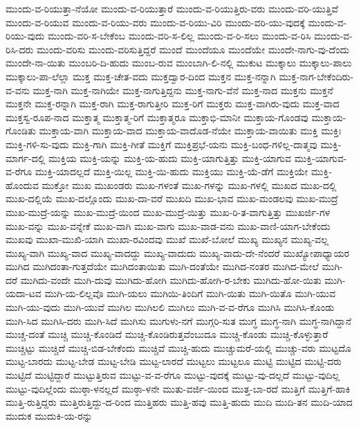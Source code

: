 {ಮುಂದು-ವ-ರಿಯುತ್ತಾ-ನೆಯೋ
ಮುಂದು-ವ-ರಿಯುತ್ತಾರೆ
ಮುಂದು-ವ-ರಿಯುತ್ತಿರು-ವರು
ಮುಂದು-ವರಿ-ಯುತ್ತಿವೆ
ಮುಂದು-ವ-ರಿಯುವ
ಮುಂದು-ವ-ರಿಯು-ವರು
ಮುಂದು-ವ-ರಿಯು-ವಿರಿ
ಮುಂದು-ವರಿ-ಯು-ವುದಕ್ಕೆ
ಮುಂದು-ವ-ರಿಯು-ವುದು
ಮುಂದು-ವರಿ-ಸ-ಬೇಕೆಂಬ
ಮುಂದು-ವರಿ-ಸ-ಲಿಲ್ಲ
ಮುಂದು-ವ-ರಿ-ಸಲು
ಮುಂದು-ವ-ರಿಸಿ
ಮುಂದು-ವ-ರಿಸಿ-ದರು
ಮುಂದು-ವರಿಸು
ಮುಂದು-ವರಿಸುತ್ತಿದ್ದರೆ
ಮುಂದೆ
ಮುಂದೆಯೂ
ಮುಂದೆಯೇ
ಮುಂದೇ-ನಾಗು-ವು-ದೆಂದು
ಮುಂದೇ-ನಾ-ಯಿತು
ಮುಂಬರಿ-ದಿ-ಹುದು
ಮುಂಬ-ರುವ
ಮುಂಬಾಗಿ-ಲಿ-ನಲ್ಲಿ
ಮುಕುಟ
ಮುಕ್ಕಾಲು
ಮುಕ್ಕಾಲು-ಪಾಲು
ಮುಕ್ಕಾಲು-ಪಾ-ಲೆಲ್ಲಾ
ಮುಕ್ತ
ಮುಕ್ತ-ಚೇತ-ವದು
ಮುಕ್ತದ್ವಾರ-ದಿಂದ
ಮುಕ್ತನ
ಮುಕ್ತ-ನನ್ನಾಗಿ
ಮುಕ್ತ-ನಾಗ-ಬೇಕೆಂದಿರು-ವ-ವನು
ಮುಕ್ತ-ನಾಗಿ
ಮುಕ್ತ-ನಾಗಿಯೇ
ಮುಕ್ತ-ನಾಗುತ್ತಿದ್ದನು
ಮುಕ್ತ-ನಾಗು-ವೆನೆ
ಮುಕ್ತ-ನಾದ
ಮುಕ್ತನು
ಮುಕ್ತನೆ
ಮುಕ್ತನೇ
ಮುಕ್ತ-ರನ್ನಾಗಿ
ಮುಕ್ತ-ರಾಗಿ
ಮುಕ್ತ-ರಾಗುತ್ತೀರಿ
ಮುಕ್ತ-ರಿಗೆ
ಮುಕ್ತರು
ಮುಕ್ತ-ವಾಗಿರು-ವುದು
ಮುಕ್ತ-ವಾದ
ಮುಕ್ತಸ್ವ-ರೂಪ-ನಾದ
ಮುಕ್ತಾತ್ಮ
ಮುಕ್ತಾತ್ಮ-ರಿಗೆ
ಮುಕ್ತಾತ್ಮರೂ
ಮುಕ್ತಾಭಿ-ಮಾನೀ
ಮುಕ್ತಾಯ-ಗೊಂಡವು
ಮುಕ್ತಾಯ-ಗೊಂಡಿತು
ಮುಕ್ತಾಯ-ವಾಗಿ
ಮುಕ್ತಾಯ-ವಾದ
ಮುಕ್ತಾಯ-ವಾದೊಡ-ನೆಯೇ
ಮುಕ್ತಾಯ-ವಾಯಿತು
ಮುಕ್ತಿ
ಮುಕ್ತಿಃ
ಮುಕ್ತಿ-ಗಳಿ-ಸು-ವುದು
ಮುಕ್ತಿ-ಗಾಗಿ
ಮುಕ್ತಿ-ಗೀತೆ
ಮುಕ್ತಿಗೆ
ಮುಕ್ತಿಪ್ರಭೆ-ಯನು
ಮುಕ್ತಿ-ಬಂಧ-ಗಳಿಲ್ಲ-ದಾತ್ಮವು
ಮುಕ್ತಿ-ಮಾರ್ಗ-ದಲ್ಲಿ
ಮುಕ್ತಿಯ
ಮುಕ್ತಿ-ಯನ್ನು
ಮುಕ್ತಿ-ಯ-ಹುದು
ಮುಕ್ತಿ-ಯಾಗುತ್ತಿತ್ತು
ಮುಕ್ತಿ-ಯಾಗುವ
ಮುಕ್ತಿ-ಯಾಗುವ-ವ-ರೆಗೂ
ಮುಕ್ತಿ-ಯಾದಲ್ಲದೆ
ಮುಕ್ತಿ-ಯಿಲ್ಲ
ಮುಕ್ತಿ-ಯಿ-ಹುದು
ಮುಕ್ತಿಯು
ಮುಕ್ತಿ-ಯೆ-ಡೆಗೆ
ಮುಕ್ತಿಯೇ
ಮುಕ್ತಿ-ಹೊಂದುವ
ಮುಕ್ತೋ
ಮುಖ
ಮುಖಂಡರು
ಮುಖ-ಗಳಂತೆ
ಮುಖ-ಗಳನ್ನು
ಮುಖ-ಗಳಲ್ಲಿ
ಮುಖದ
ಮುಖ-ದಲ್ಲಿ
ಮುಖ-ದಲ್ಲಿಯೆ
ಮುಖ-ದಲ್ಲೊಂದು
ಮುಖ-ದಾ-ವರೆ
ಮುಖದಿ
ಮುಖ-ಭಾವ
ಮುಖ-ಮಂಡಲವು
ಮುಖ-ಮುದ್ರೆ
ಮುಖ-ಮುದ್ರೆ-ಯನ್ನು
ಮುಖ-ಮುದ್ರೆ-ಯಿಂದ
ಮುಖ-ಮುದ್ರೆ-ಯಿತ್ತು
ಮುಖ-ರಿ-ತ-ವಾಗುತ್ತಿತ್ತು
ಮುಖರ್ಜಿ-ಗಳ
ಮುಖ-ವನ್ನು
ಮುಖ-ವನ್ನೇಕೆ
ಮುಖ-ವಾಗಿ
ಮುಖ-ವಾಗು
ಮುಖ-ವಾಡ-ವನು
ಮುಖ-ವಾಣಿ-ಯಾಗ-ಬೇಕೆಂದು
ಮುಖವು
ಮುಖಾ-ಮುಖಿ-ಯಾಗಿ
ಮುಖಾ-ರವಿಂದವು
ಮುಖೆ
ಮುಖೆ-ಬೋಲೆ
ಮುಖ್ಯ
ಮುಖ್ಯನ
ಮುಖ್ಯ-ವಲ್ಲ
ಮುಖ್ಯ-ವಾಗಿ
ಮುಖ್ಯ-ವಾದ
ಮುಖ್ಯ-ವಾದದ್ದು
ಮುಖ್ಯ-ವಾದುದು
ಮುಖ್ಯ-ವಾದು-ದೇ-ನೆಂದರೆ
ಮುಖ್ಯೋಪಾಧ್ಯಾಯರ
ಮುಗಿದ
ಮುಗಿದಂತಾ-ಗುತ್ತದೆಯೇ
ಮುಗಿದಂತಾಯಿತು
ಮುಗಿ-ದಂತೆಯೇ
ಮುಗಿದ-ನಂತರ
ಮುಗಿದ-ಮೇಲೆ
ಮುಗಿ-ದರೆ
ಮುಗಿದು-ವಂದೇ
ಮುಗಿ-ದುವು
ಮುಗಿದು-ಹೋಗಿ
ಮುಗಿದು-ಹೋಗಿ-ರ-ಬೇಕು
ಮುಗಿದು-ಹೋ-ಯಿತು
ಮುಗಿ-ಯದಾ-ಟವ
ಮುಗಿ-ಯ-ಲಿಲ್ಲವೊ
ಮುಗಿ-ಯಲು
ಮುಗಿಯಿ-ತಿಂದಿಗೆ
ಮುಗಿ-ಯಿತು
ಮುಗಿ-ಯಿತೊ
ಮುಗಿ-ಯುವ
ಮುಗಿ-ಯು-ವುದು
ಮುಗಿ-ಯುವೆ
ಮುಗಿಲ
ಮುಗಿಲಲಿ
ಮುಗಿಲು
ಮುಗಿ-ವ-ವ-ರೆಗೂ
ಮುಗಿಸಿ
ಮುಗಿಸಿ-ಕೊಂಡು
ಮುಗಿ-ಸಿದ
ಮುಗಿಸಿ-ದರು
ಮುಗಿ-ಸಿದೆ
ಮುಗಿಸು
ಮುಗುಳು-ನಗೆ
ಮುಗ್ಗರಿ-ಸುತ
ಮುಗ್ಧ
ಮುಗ್ಧ-ನಾಗಿ
ಮುಗ್ಧ-ನಾಗಿದ್ದಾನೆ
ಮುಚ್ಚ-ದಂತೆ
ಮುಚ್ಚಿ
ಮುಚ್ಚಿ-ಕೊಂಡಿದೆ
ಮುಚ್ಚಿ-ಕೊಂಡಿರುತ್ತವೆಂಬುದೂ
ಮುಚ್ಚಿ-ಕೊಂಡು
ಮುಚ್ಚಿ-ಕೊಳ್ಳುತ್ತಾರೆ
ಮುಚ್ಚಿಟ್ಟು
ಮುಚ್ಚಿದೆ
ಮುಚ್ಚಿ-ಬಿಡ-ಬೇಕೆಂದು
ಮುಚ್ಚಿವೆ
ಮುಚ್ಚಿ-ಹುದು
ಮುಚ್ಚುಮರೆ-ಯಲ್ಲಿ
ಮುಚ್ಚು-ವರು
ಮುಟ್ಟದೊ
ಮುಟ್ಟ-ಬಾರದು
ಮುಟ್ಟ-ಬೇಡ
ಮುಟ್ಟ-ಬೇಡಿ
ಮುಟ್ಟ-ಲಾರದೆ
ಮುಟ್ಟಲು
ಮುಟ್ಟಲೂ
ಮುಟ್ಟಿ
ಮುಟ್ಟಿದ
ಮುಟ್ಟಿ-ದರು
ಮುಟ್ಟಿದೆ
ಮುಟ್ಟಿದ್ದಾರೆ
ಮುಟ್ಟುತ್ತಿರುವ
ಮುಟ್ಟು-ವ-ವ-ರೆಗೂ
ಮುಟ್ಟು-ವುದಕ್ಕೆ
ಮುಟ್ಟು-ವು-ದಲ್ಲದೆ
ಮುಟ್ಟು-ವುದಿಲ್ಲ
ಮುಟ್ಟು-ವುದಿಲ್ಲೆಂದು
ಮುಠ್ಠಾ-ಳನಲ್ಲದೆ
ಮುಠ್ಠಾ-ಳನೇ
ಮುತು-ವರ್ಜಿ-ಯಿಂದ
ಮುತ್ತ-ಬಾ-ರದೆ
ಮುತ್ತಿಗೆ
ಮುತ್ತಿಗೆ-ಹಾಕಿ
ಮುತ್ತಿ-ರುತ್ತಿದ್ದರು
ಮುತ್ತಿರುತ್ತಿದ್ದು-ದ-ರಿಂದ
ಮುತ್ತಿಹರು
ಮುತ್ತಿ-ಹವು
ಮುತ್ತಿ-ಹುದು
ಮುದಿ
ಮುದಿ-ತನ
ಮುದಿ-ಯಾದ
ಮುದುಕ
ಮುದುಕಿ-ಯ-ರನ್ನು
}
